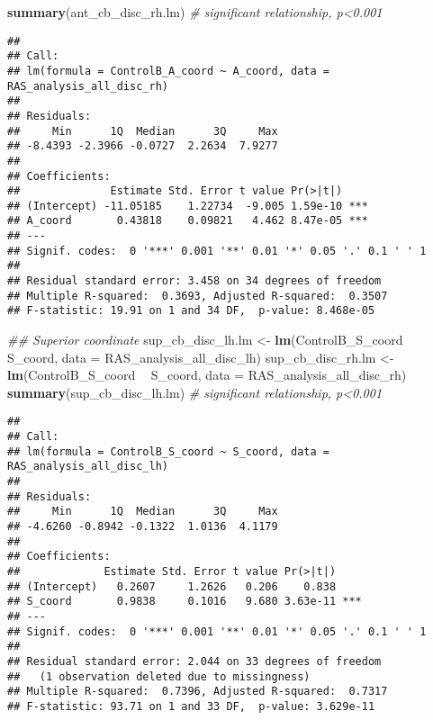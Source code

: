 \documentclass[
]{article}
\newenvironment{Shaded}{\begin{snugshade}}{\end{snugshade}}
\newcommand{\CommentTok}[1]{\textcolor[rgb]{0.56,0.35,0.01}{\textit{#1}}}
\newcommand{\DataTypeTok}[1]{\textcolor[rgb]{0.13,0.29,0.53}{#1}}
\newcommand{\KeywordTok}[1]{\textcolor[rgb]{0.13,0.29,0.53}{\textbf{#1}}}
\newcommand{\NormalTok}[1]{#1}
\newcommand{\OperatorTok}[1]{\textcolor[rgb]{0.81,0.36,0.00}{\textbf{#1}}}
\newcommand{\StringTok}[1]{\textcolor[rgb]{0.31,0.60,0.02}{#1}}
\begin{document}
\begin{Shaded}
\begin{Highlighting}[]
\KeywordTok{summary}\NormalTok{(ant_cb_disc_rh.lm) }\CommentTok{# significant relationship, p<0.001}
\end{Highlighting}
\end{Shaded}

\begin{verbatim}
## 
## Call:
## lm(formula = ControlB_A_coord ~ A_coord, data = RAS_analysis_all_disc_rh)
## 
## Residuals:
##     Min      1Q  Median      3Q     Max 
## -8.4393 -2.3966 -0.0727  2.2634  7.9277 
## 
## Coefficients:
##              Estimate Std. Error t value Pr(>|t|)    
## (Intercept) -11.05185    1.22734  -9.005 1.59e-10 ***
## A_coord       0.43818    0.09821   4.462 8.47e-05 ***
## ---
## Signif. codes:  0 '***' 0.001 '**' 0.01 '*' 0.05 '.' 0.1 ' ' 1
## 
## Residual standard error: 3.458 on 34 degrees of freedom
## Multiple R-squared:  0.3693, Adjusted R-squared:  0.3507 
## F-statistic: 19.91 on 1 and 34 DF,  p-value: 8.468e-05
\end{verbatim}

\begin{Shaded}
\begin{Highlighting}[]
\CommentTok{## Superior coordinate}
\NormalTok{sup_cb_disc_lh.lm <-}\StringTok{ }\KeywordTok{lm}\NormalTok{(ControlB_S_coord }\OperatorTok{~}\StringTok{ }\NormalTok{S_coord, }\DataTypeTok{data =}\NormalTok{ RAS_analysis_all_disc_lh)}
\NormalTok{sup_cb_disc_rh.lm <-}\StringTok{ }\KeywordTok{lm}\NormalTok{(ControlB_S_coord }\OperatorTok{~}\StringTok{ }\NormalTok{S_coord, }\DataTypeTok{data =}\NormalTok{ RAS_analysis_all_disc_rh)}
\KeywordTok{summary}\NormalTok{(sup_cb_disc_lh.lm) }\CommentTok{# significant relationship, p<0.001}
\end{Highlighting}
\end{Shaded}

\begin{verbatim}
## 
## Call:
## lm(formula = ControlB_S_coord ~ S_coord, data = RAS_analysis_all_disc_lh)
## 
## Residuals:
##     Min      1Q  Median      3Q     Max 
## -4.6260 -0.8942 -0.1322  1.0136  4.1179 
## 
## Coefficients:
##             Estimate Std. Error t value Pr(>|t|)    
## (Intercept)   0.2607     1.2626   0.206    0.838    
## S_coord       0.9838     0.1016   9.680 3.63e-11 ***
## ---
## Signif. codes:  0 '***' 0.001 '**' 0.01 '*' 0.05 '.' 0.1 ' ' 1
## 
## Residual standard error: 2.044 on 33 degrees of freedom
##   (1 observation deleted due to missingness)
## Multiple R-squared:  0.7396, Adjusted R-squared:  0.7317 
## F-statistic: 93.71 on 1 and 33 DF,  p-value: 3.629e-11
\end{verbatim}
\end{document}
